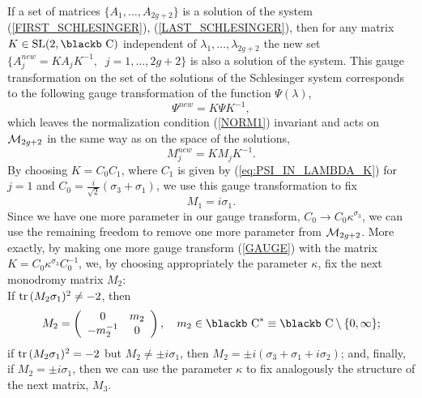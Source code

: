 \documentclass[11pt]{article}
\def\Bbb#1{\hbox{\blackb #1}}
\def\l{\lambda}
\begin{document}
If a set of matrices $\{A_1,\dots,A_{2g+2}\}$ is a solution of 
the system (\ref{FIRST_SCHLESINGER}), (\ref{LAST_SCHLESINGER}), then 
for any matrix $K\in{\rm SL}(2,\Bbb C)$ independent of $\lambda_1,\dots,
\lambda_{2g+2}$ the new set $\{A_j^{new}\!=KA_jK^{-1},\;\; j=1,\dots,2g+2\}$ 
is also a solution of the system. This gauge transformation on the
set of the solutions of the Schlesinger system corresponds to the
following gauge transformation of the function $\Psi(\l)$, 
\begin{equation}
  \label{GAUGE}
\Psi^{new}=K\Psi K^{-1},
\end{equation} 
which leaves the normalization condition (\ref{NORM1})  invariant and
acts on ${\cal M}_{2g+2}$ in the same way as on the space of the 
solutions, 
\begin{equation}\label{CONJUGATION}
M_j^{new}=KM_jK^{-1}.
\end{equation} 
By choosing $K=C_0C_1$, where
$C_1$ is given by (\ref{eq:PSI_IN_LAMBDA_K}) for $j=1$ and
$C_0=\frac i{\sqrt 2}(\sigma_3+\sigma_1)$, 
we use this gauge transformation to fix 
\begin{equation}
  \label{eq:NORM2}
M_1=i\sigma_1.
\end{equation}
Since we have one more parameter in our gauge transform, 
$C_0\to C_0\kappa^{\sigma_3}$, we can use the remaining freedom to remove
one more parameter from ${\cal M}_{2g+2}$. More exactly, by making one
more gauge transform (\ref{GAUGE}) with the matrix 
$K=C_0\kappa^{\sigma_3}C_0^{-1}$, we, by choosing appropriately the 
parameter $\kappa$, fix the next monodromy matrix $M_2$:\\
If ${\rm tr}\,(M_2\sigma_1)^2\neq -2$, then 
\begin{equation}
  \label{eq:NORM3}
M_2=\left(\begin{array}{cc}
0&m_2\\
-m_2^{-1}&0\end{array}\right),\quad 
m_2\in\Bbb C^*\equiv\Bbb C\setminus\{0,\infty\};
\end{equation}
if ${\rm tr}\,(M_2\sigma_1)^2=-2$ but $M_2\neq\pm i\sigma_1$, then
$M_2=\pm i(\sigma_3+\sigma_1+i\sigma_2)$; and, finally, if 
$M_2=\pm i\sigma_1$, then we can use the parameter $\kappa$ to fix 
analogously the structure of the next matrix, $M_3$.
\end{document}
